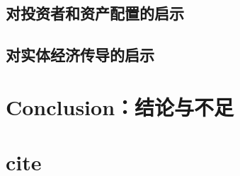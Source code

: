 \documentclass[UTF8,zihao=-4]{ctexart}
\begin{document}
\subsection{对投资者和资产配置的启示}


\subsection{对实体经济传导的启示}


\section{Conclusion：结论与不足}

%
%

\section{cite}
\end{document}
